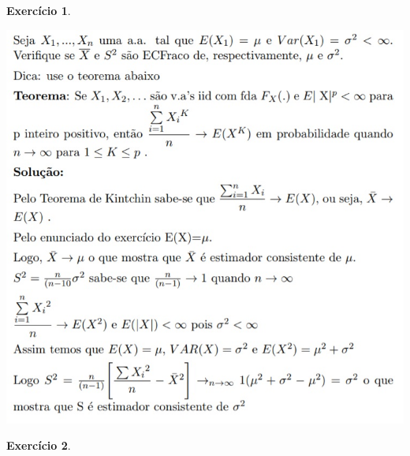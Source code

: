 \documentclass[letter,11pt]{article}
\newtheorem{exer}{Exercício}
\newcommand{\E}{\mathbb{E}}
\begin{document}
\begin{exer} \rm
\end{exer}
\includegraphics[scale=0.7]{gabarito_ex9_lista7.jpg}


\begin{exer} \rm
\end{exer}
\end{document}
